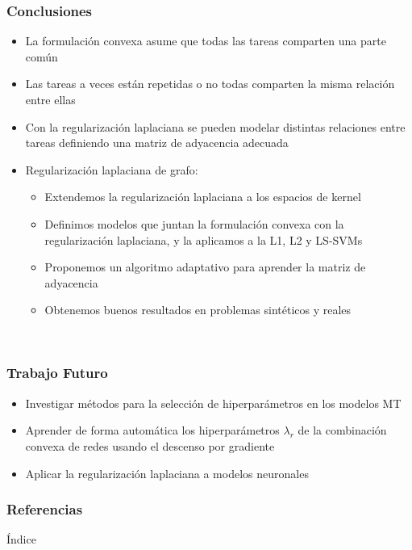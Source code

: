 \documentclass[aspectratio=43,spanish]{beamer}
\begin{document}
\begin{frame}
\frametitle{Conclusiones}
\begin{itemize}
      
      \item La formulación convexa asume que todas las tareas comparten una parte común
      \item Las tareas a veces están repetidas o no todas comparten la misma relación entre ellas
      \item Con la regularización laplaciana se pueden modelar distintas relaciones entre tareas definiendo una matriz de adyacencia adecuada
      \item Regularización laplaciana de grafo:
      \begin{itemize}
            \item Extendemos la regularización laplaciana a los espacios de kernel
            \item Definimos modelos que juntan la formulación convexa con la regularización laplaciana, y la aplicamos a la L1, L2 y LS-SVMs
            \item Proponemos un algoritmo adaptativo para aprender la matriz de adyacencia
            \item Obtenemos buenos resultados en problemas sintéticos y reales
      \end{itemize}
      \  
\end{itemize}
\end{frame}

\begin{frame}
      \frametitle{Trabajo Futuro}

      \begin{itemize}
            \item Investigar métodos para la selección de hiperparámetros en los modelos MT 
            \item Aprender de forma automática los hiperparámetros $\lambda_r$ de la combinación convexa de redes usando el descenso por gradiente
            \item Aplicar la regularización laplaciana a modelos neuronales
      \end{itemize}

\end{frame}


\begin{frame}[allowframebreaks]
      \frametitle{Referencias}

      \printbibliography

\end{frame}


\backmatter

\begin{frame}{Índice}{}
      \tableofcontents
\end{frame}
\end{document}
